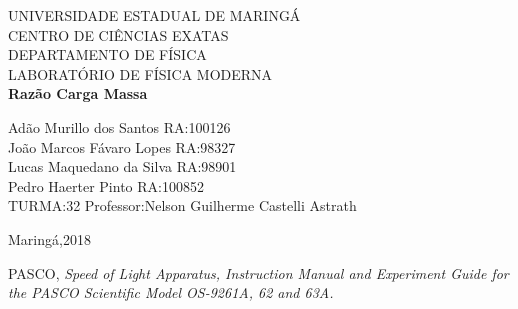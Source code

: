 \documentclass[a4paper,10pt]{article}
\begin{document}
	
	\begin{titlepage}
		\begin{center}
		{\large UNIVERSIDADE ESTADUAL DE MARINGÁ}\\[0.2cm]
		{\large CENTRO DE CIÊNCIAS EXATAS}\\[0.2cm]
		{\large DEPARTAMENTO DE FÍSICA}\\[0.2cm]
		{\large LABORATÓRIO DE FÍSICA MODERNA}\\[7.0cm]
		{\bf \huge Razão Carga Massa}\\[7.0cm]
		\end{center}
	{\large Adão Murillo dos Santos \hfill RA:100126}\\[0.7cm]
	{\large João Marcos Fávaro Lopes \hfill RA:98327}\\[0.7cm]
	{\large Lucas Maquedano da Silva \hfill RA:98901}\\[0.7cm]
	{\large Pedro Haerter Pinto \hfill RA:100852}\\[0.7cm]
	{\large TURMA:32 \hfill Professor:Nelson Guilherme Castelli
	Astrath}
	
	\vfill
		\begin{center}
		{\large Maringá,2018}
		\end{center}
	\end{titlepage}

	\tableofcontents
	
		
\vspace{3cm}
	\begin{thebibliography}{1}
    	PASCO, \it{Speed of Light Apparatus}, Instruction Manual and 	Experiment Guide for the PASCO Scientific Model OS-9261A, 62 and 63A.
	\end{thebibliography}	
	
\end{document}

